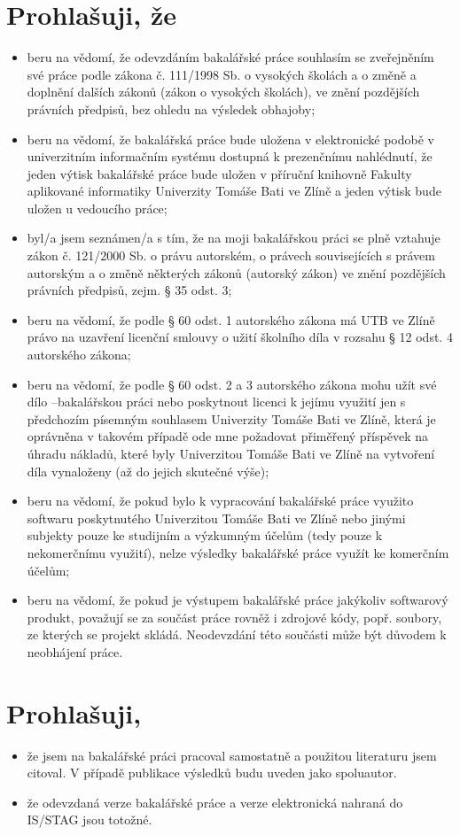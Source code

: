 \documentclass[a4paper,12pt]{article}
\newcommand{\nmm}[1]{\section*{#1}} %
\begin{document}
\clearpage
\thispagestyle{empty}
\clearpage
\nmm{Prohlašuji, že}
\begin{itemize}\fontsize{10}{1}
\normalsize
\item beru na vědomí, že odevzdáním bakalářské práce souhlasím se zveřejněním své práce podle zákona č. 111/1998 Sb. o vysokých školách a o změně a doplnění dalších zákonů (zákon o vysokých školách), ve znění pozdějších právních předpisů, bez ohledu na výsledek obhajoby;
\item beru na vědomí, že bakalářská práce bude uložena v elektronické podobě v univerzitním informačním systému dostupná k prezenčnímu nahlédnutí, že jeden výtisk bakalářské práce bude uložen v příruční knihovně Fakulty aplikované informatiky Univerzity Tomáše Bati ve Zlíně a jeden výtisk bude uložen u vedoucího práce; 
\item byl/a jsem seznámen/a s tím, že na moji bakalářskou práci se plně vztahuje zákon č. 121/2000 Sb. o právu autorském, o právech souvisejících s právem autorským a o změně některých zákonů (autorský zákon) ve znění pozdějších právních předpisů, zejm. § 35 odst. 3;
\item beru na vědomí, že podle § 60 odst. 1 autorského zákona má UTB ve Zlíně právo na uzavření licenční smlouvy o užití školního díla v rozsahu § 12 odst. 4 autorského zákona;
\item beru na vědomí, že podle § 60 odst. 2 a 3 autorského zákona mohu užít své dílo –bakalářskou práci nebo poskytnout licenci k jejímu využití jen s předchozím písemným souhlasem Univerzity Tomáše Bati ve Zlíně, která je oprávněna v takovém případě ode mne požadovat přiměřený příspěvek na úhradu nákladů, které byly Univerzitou Tomáše Bati ve Zlíně na vytvoření díla vynaloženy (až do jejich skutečné výše);
\item beru na vědomí, že pokud bylo k vypracování bakalářské práce
využito softwaru poskytnutého Univerzitou Tomáše Bati ve Zlíně nebo jinými
subjekty pouze ke studijním a výzkumným účelům (tedy pouze k nekomerčnímu
využití), nelze výsledky bakalářské práce využít ke komerčním
účelům;
\item beru na vědomí, že pokud je výstupem bakalářské práce jakýkoliv softwarový produkt, považují se za součást práce rovněž i zdrojové kódy, popř. soubory, ze kterých se projekt skládá. Neodevzdání této součásti může být důvodem k neobhájení práce.
\end{itemize}
\nmm{Prohlašuji,}
\begin{itemize}
 \normalsize
\item že jsem na bakalářské práci pracoval samostatně a použitou literaturu jsem citoval. V případě publikace výsledků budu uveden jako spoluautor.
\item že odevzdaná verze bakalářské práce a verze elektronická nahraná do IS/STAG jsou totožné.
\end{itemize}
\end{document}
